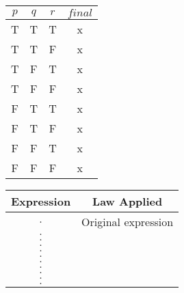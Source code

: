 \documentclass[letterpaper]{article}
\begin{document}
\begin{tabular}{|c|c|c|c|} 
 \hline
 $p$ & $q$ & $r$ & $final$\\ 
 \hline
 T & T & T & x\\ 
 T & T & F & x\\
 T & F & T & x\\
 T & F & F & x\\
 F & T & T & x\\
 F & T & F & x\\
 F & F & T & x\\
 F & F & F & x\\
 \hline
\end{tabular}

\begin{tabular}{|c|c|} 
 \hline
 Expression & Law Applied\\ 
 \hline
 $.$ & Original expression\\ 
 $.$ & \\ 
 $.$ & \\ 
 $.$ & \\ 
 $.$ & \\ 
 $.$ & \\ 
 $.$ & \\ 
 $.$ & \\ 
 $.$ & \\ 
 $.$ & \\ 
 $.$ & \\ 
 \hline
\end{tabular}
\end{document}
